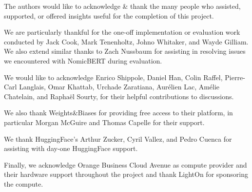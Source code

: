 The authors would like to acknowledge \& thank the many people who assisted, supported, or offered insights useful for the completion of this project.

We are particularly thankful for the one-off implementation or evaluation work conducted by Jack Cook, Mark Tenenholtz, Johno Whitaker, and Wayde Gilliam. We also extend similar thanks to Zach Nussbaum for assisting in resolving issues we encountered with NomicBERT during evaluation.

We would like to acknowledge Enrico Shippole, Daniel Han, Colin Raffel, Pierre-Carl Langlais, Omar Khattab, Urchade Zaratiana, Aurélien Lac, Amélie Chatelain, and Raphaël Sourty, for their helpful contributions to discussions.

We also thank Weights\&Biases for providing free access to their platform, in particular Morgan McGuire and Thomas Capelle for their support.

We thank HuggingFace's Arthur Zucker, Cyril Vallez, and Pedro Cuenca for assisting with day-one HuggingFace support.

Finally, we acknowledge Orange Business Cloud Avenue as compute provider and their hardware support throughout the project and thank LightOn for sponsoring the compute.